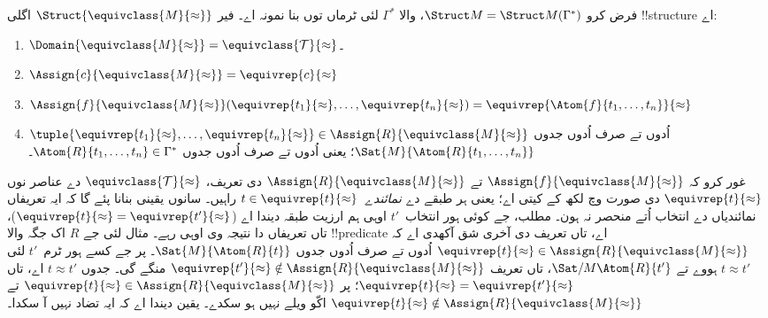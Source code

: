 \documentclass[../../../include/open-logic-section]{subfiles}
\begin{document}
\begin{defn}
فرض کرو $\Struct M = \Struct M(\Gamma^*)$،
 والا
$\Gamma^*$ لئی ٹرماں توں بنا نمونہ اے۔
فیر $\Struct{\equivclass{M}{\approx}}$
اگلی !!{structure} اے:
\begin{enumerate}
\item $\Domain{\equivclass{M}{\approx}} = \equivclass{\mathcal{T}}{\approx}$۔
\item $\Assign{c}{\equivclass{M}{\approx}} = \equivrep{c}{\approx}$
\item $\Assign{f}{\equivclass{M}{\approx}}(\equivrep{t_1}{\approx}, \dots,
  \equivrep{t_n}{\approx}) = \equivrep{\Atom{f}{t_1,\dots, t_n}}{\approx}$
\item $\tuple{\equivrep{t_1}{\approx}, \dots, \equivrep{t_n}{\approx}} \in
  \Assign{R}{\equivclass{M}{\approx}}$ اُدوں تے
  صرف اُدوں جدوں
  $\Sat{M}{\Atom{R}{t_1,\dots, t_n}}$؛ یعنی
  اُدوں تے صرف اُدوں جدوں
  $\Atom{R}{t_1,\dots, t_n} \in \Gamma^*$۔
\end{enumerate}
\end{defn}

\begin{explain}
غور کرو کہ
$\Assign{f}{\equivclass{M}{\approx}}$
تے $\Assign{R}{\equivclass{M}{\approx}}$
دی تعریف، $\equivclass{\mathcal{T}}{\approx}$
دے عناصر نوں $\equivrep{t}{\approx}$ دی
صورت وچ لکھ کے کیتی اے؛ یعنی ہر طبقے دے
\emph{نمائندے}~$t \in \equivrep{t}{\approx}$
راہیں۔ سانوں یقینی بنانا پئے گا کہ ایہ
تعریفاں نمائندیاں دے انتخاب اُتے منحصر نہ
ہون۔ مطلب، جے کوئی ہور انتخاب~$t'$ اوہی
ہم ارزیت طبقہ دیندا اے
($\equivrep{t}{\approx} = \equivrep{t'}{\approx}$)،
تاں تعریفاں دا نتیجہ وی اوہی رہے۔ مثال
لئی جے $R$ اک جگہ والا !!{predicate}
اے، تاں تعریف دی آخری شق آکھدی اے کہ
$\equivrep{t}{\approx} \in
\Assign{R}{\equivclass{M}{\approx}}$ اُدوں
تے صرف اُدوں جدوں
$\Sat{M}{\Atom{R}{t}}$۔ پر جے کسے ہور
ٹرم~$t'$ لئی $t \approx t'$ ہووے تے
$\Sat/{M}{\Atom{R}{t'}}$، تاں تعریف
$\equivrep{t'}{\approx} \notin
\Assign{R}{\equivclass{M}{\approx}}$
منگے گی۔ جدوں $t \approx t'$ اے، تاں
$\equivrep{t}{\approx} =
\equivrep{t'}{\approx}$؛ پر
$\equivrep{t}{\approx}
\in \Assign{R}{\equivclass{M}{\approx}}$
تے $\equivrep{t}{\approx}
\notin \Assign{R}{\equivclass{M}{\approx}}$
اکّو ویلے نہیں ہو سکدے۔
 یقین دیندا اے کہ
ایہ تضاد نہیں آ سکدا۔
\end{explain}
\end{document}
